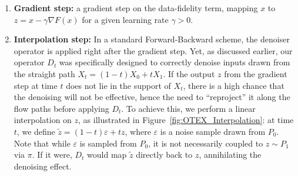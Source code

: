 \documentclass{article} %
\theoremstyle{definition}
\begin{document}
\begin{enumerate}
    \item \textbf{Gradient step:} a gradient step on the data-fidelity term, mapping $x$ to $z= x- \gamma \nabla F(x)$ for a given learning rate $\gamma >0$.
    \item \textbf{Interpolation step:} 
     In a standard Forward-Backward scheme, the denoiser operator is applied right after the gradient step.
     Yet, as discussed earlier, our operator $D_t$ was specifically designed to correctly denoise inputs drawn from the straight path $X_t = (1-t) X_0 + t X_1$.
    If the output $z$ from the gradient step  at time $t$ does not lie in the support of $X_t$, there is a high chance that the denoising will not be effective,
     hence the need to ``reproject'' 
     it along the flow paths before applying $D_t$.
     To achieve this, we perform a linear interpolation on $z$, as illustrated in Figure~\ref{fig:OTEX_Interpolation}: at time $t$, we define $\tilde{z} = (1-t)\varepsilon + t z$, where $\varepsilon$ is a noise sample drawn from $P_0$. Note that while $\varepsilon$ is sampled from $P_0$, it is not necessarily coupled to $z \sim P_1$ via $\pi$. If it were, $D_t$ would map $\tilde{z}$ directly back to $z$, annihilating the denoising effect. 

     
    




\end{enumerate}
\end{document}
